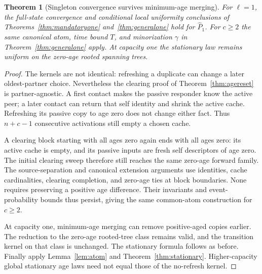 \documentclass[11pt]{article}
\newtheorem{theorem}{Theorem}
\begin{document}
\begin{theorem}[Singleton convergence survives minimum-age merging]
\label{thm:thesisone}
For $\ell=1$, the full-state convergence and conditional local
uniformity conclusions of Theorems~\ref{thm:mandatoryone}
and~\ref{thm:generalone} hold for $\widehat P_1$.
For $c\ge2$ the same canonical atom, time bound $T$, and
minorization $\gamma$ in Theorem~\ref{thm:generalone} apply.
At capacity one the stationary law remains uniform on the
zero-age rooted spanning trees.
\end{theorem}
\begin{proof}
The kernels are not identical: refreshing a duplicate can
change a later oldest-partner choice. Nevertheless the clearing
proof of Theorem~\ref{thm:agereset} is partner-agnostic.
A first contact makes the passive responder know the active
peer; a later contact can return that self identity and shrink
the active cache. Refreshing its passive copy to age zero
does not change either fact. Thus $n+c-1$ consecutive
activations still empty a chosen cache.

A clearing block starting with all ages zero again ends with
all ages zero: its active cache is empty, and its passive
inputs are fresh self descriptors of age zero.
The initial clearing sweep therefore still reaches the same
zero-age forward family. The source-separation and canonical
extension arguments use identities, cache cardinalities,
clearing completion, and zero-age ties at block boundaries.
None requires preserving a positive age difference.
Their invariants and event-probability bounds thus persist,
giving the same common-atom construction for $c\ge2$.

At capacity one, minimum-age merging can remove positive-aged
copies earlier. The reduction to the zero-age rooted-tree
class remains valid, and the transition kernel on that class
is unchanged. The stationary formula follows as before.
Finally apply Lemma~\ref{lem:atom} and
Theorem~\ref{thm:stationary}. Higher-capacity global stationary
age laws need not equal those of the no-refresh kernel.
\end{proof}
\end{document}

